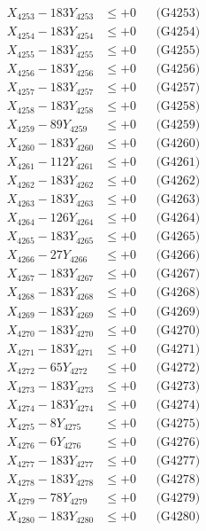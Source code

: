 \documentclass[a4paper,10pt]{article}
\begin{document}
{\begin{align}
X_{4253} - 183Y_{4253} &\leq +0 && \text{(G4253)} \\
X_{4254} - 183Y_{4254} &\leq +0 && \text{(G4254)} \\
X_{4255} - 183Y_{4255} &\leq +0 && \text{(G4255)} \\
X_{4256} - 183Y_{4256} &\leq +0 && \text{(G4256)} \\
X_{4257} - 183Y_{4257} &\leq +0 && \text{(G4257)} \\
X_{4258} - 183Y_{4258} &\leq +0 && \text{(G4258)} \\
X_{4259} - 89Y_{4259} &\leq +0 && \text{(G4259)} \\
X_{4260} - 183Y_{4260} &\leq +0 && \text{(G4260)} \\
\allowbreak
X_{4261} - 112Y_{4261} &\leq +0 && \text{(G4261)} \\
X_{4262} - 183Y_{4262} &\leq +0 && \text{(G4262)} \\
X_{4263} - 183Y_{4263} &\leq +0 && \text{(G4263)} \\
X_{4264} - 126Y_{4264} &\leq +0 && \text{(G4264)} \\
X_{4265} - 183Y_{4265} &\leq +0 && \text{(G4265)} \\
X_{4266} - 27Y_{4266} &\leq +0 && \text{(G4266)} \\
X_{4267} - 183Y_{4267} &\leq +0 && \text{(G4267)} \\
X_{4268} - 183Y_{4268} &\leq +0 && \text{(G4268)} \\
X_{4269} - 183Y_{4269} &\leq +0 && \text{(G4269)} \\
X_{4270} - 183Y_{4270} &\leq +0 && \text{(G4270)} \\
\allowbreak
X_{4271} - 183Y_{4271} &\leq +0 && \text{(G4271)} \\
X_{4272} - 65Y_{4272} &\leq +0 && \text{(G4272)} \\
X_{4273} - 183Y_{4273} &\leq +0 && \text{(G4273)} \\
X_{4274} - 183Y_{4274} &\leq +0 && \text{(G4274)} \\
X_{4275} - 8Y_{4275} &\leq +0 && \text{(G4275)} \\
X_{4276} - 6Y_{4276} &\leq +0 && \text{(G4276)} \\
X_{4277} - 183Y_{4277} &\leq +0 && \text{(G4277)} \\
X_{4278} - 183Y_{4278} &\leq +0 && \text{(G4278)} \\
X_{4279} - 78Y_{4279} &\leq +0 && \text{(G4279)} \\
X_{4280} - 183Y_{4280} &\leq +0 && \text{(G4280)} \\

\end{align}}
\end{document}

